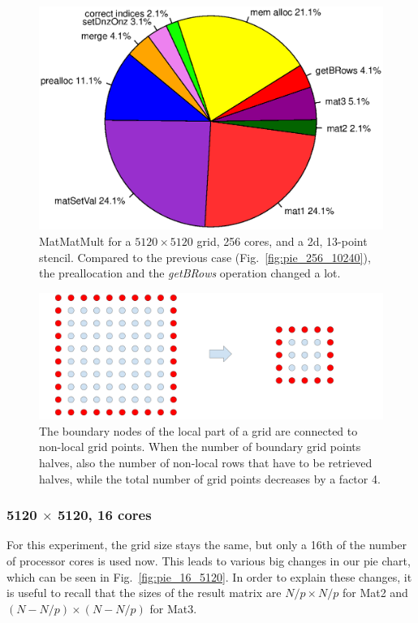 \begin{figure}[tbp]
	\centering
	\includegraphics[width=1\textwidth, trim={0 3.cm 0 3cm},clip]{256cores_5120}
	\caption{MatMatMult for a $5120 \times 5120$ grid, 256 cores, and a 2d, 13-point stencil. Compared to the previous case (Fig.~\ref{fig:pie_256_10240}), the preallocation and the \textit{getBRows} operation changed a lot.} 
	\label{fig:pie_256_5120}
\end{figure}
\begin{figure}[tbp]
	\centering


	\includegraphics[width=1\textwidth]{4_large_small}
	\caption{The boundary nodes of the local part of a grid are connected to non-local grid points. When the number of boundary grid points halves, also the number of non-local rows that have to be retrieved halves, while the total number of grid points decreases by a factor 4.} 
	\label{fig:large_small}
\end{figure}

\subsubsection*{5120 $\times$ 5120, 16 cores}
For this experiment, the grid size stays the same, but only a 16th of the number of processor cores is used now. This leads to various big changes in our pie chart, which can be seen in Fig.~\ref{fig:pie_16_5120}. In order to explain these changes, it is useful to recall that the sizes of the result matrix are $N/p \times N/p$ for Mat2 and $(N-N/p) \times (N-N/p)$ for Mat3.

